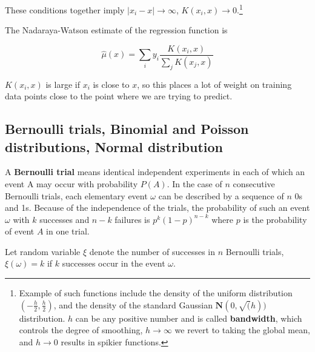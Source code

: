 \documentclass{article}
\begin{document}
These conditions together imply $|x_i - x| \to \infty$, $K(x_i, x) \to 0$.\footnote{Example of such functions include the density of the uniform distribution $(-\frac{h}{2}, \frac{h}{2})$, and the density of the standard Gaussian $\mathbf{N}(0, \sqrt(h))$ distribution. $h$ can be any positive number and is called \textbf{bandwidth}, which controls the degree of smoothing, $h \to \infty$ we revert to taking the global mean, and $h \to 0$ results in spikier functions.}

The Nadaraya-Watson estimate of the regression function is

$$
\hat{\mu}(x) = \sum_i{y_i \frac{K(x_i, x)}{\sum_j{K(x_j, x)}}}
$$

$K(x_i, x)$ is large if $x_i$ is close to $x$, so this places a lot of weight on training data points close to the point where we are trying to predict.





% 



\subsection{Bernoulli trials, Binomial and Poisson distributions, Normal distribution}

A \textbf{Bernoulli trial} means identical independent experiments in each of which an event A may occur with probability $P(A)$.
In the case of $n$ consecutive Bernoulli trials, each elementary event $\omega$ can be described by a sequence of $n$ 0s and 1s.
Because of the independence of the trials, the probability of such an event $\omega$ with $k$ successes and $n - k$ failures is $p^k (1 - p)^{n - k}$ where $p$ is the probability of event $A$ in one trial.

Let random variable $\xi$ denote the number of successes in $n$ Bernoulli trials, $\xi(\omega) = k$ if $k$ successes occur in the event $\omega$.
\end{document}
